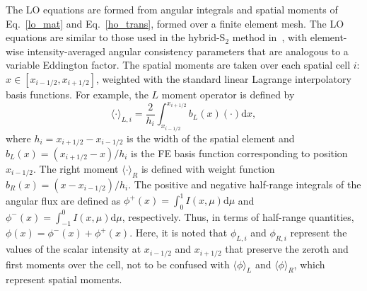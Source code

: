 \documentclass{mc2013}
\renewcommand{\d}{\mathrm{d}}
\newcommand{\mom}[1]{\langle #1 \rangle}
\newcommand{\xr}{{x_{i+1/2}}}
\newcommand{\il}{{i-1/2}}
\newcommand{\ir}{{i+1/2}}
\begin{document}


The LO equations are formed from
angular integrals and spatial moments of
Eq.~\eqref{lo_mat} and Eq.~\eqref{ho_trans}, formed over a finite element mesh. The
LO equations are similar to those used in the
hybrid-S$_2$ method in~\cite{wolters}, with
element-wise intensity-averaged angular consistency parameters that are analogous to a variable
Eddington factor.  The spatial moments are taken over each spatial cell $i$:
$x\in[x_{i-1/2},x_{i+1/2}]$, weighted with the standard linear Lagrange
interpolatory basis functions.  For example, the $L$  moment operator is defined by
\begin{equation}\label{x_mom}
\mom{\cdot}_{L,i} = \frac{2}{h_i} \int_{x_{i-1/2}}^{\xr} b_L(x) (\cdot) \d x,
\end{equation}
where $h_i=x_{i+1/2}-x_{i-1/2}$ is the width of the spatial element and
$b_L(x)=(x_{i+1/2}-x)/h_i$ is the FE basis function corresponding to position
$x_{i-1/2}$.  The right moment $\mom{\cdot}_R$ is defined with weight function $b_R(x)=(x -
x_{i-1/2})/h_i$.  The positive and negative half-range integrals of the angular flux are defined as
$ \phi^+(x) = \int_0^{1} I(x,\mu) \d \mu$ and $ \phi^-(x) = \int_{-1}^{0} I(x,\mu) \d
\mu$, respectively.  Thus, in terms of half-range quantities, $\phi(x) = \phi^-(x) +
\phi ^+(x)$.  Here, it is noted that $\phi_{L,i}$ and $\phi_{R,i}$ represent
the values of the scalar intensity at $x_\il$ and $x_\ir$ that preserve the zeroth
and first moments over the cell, not to be confused with $\mom{\phi}_L$ and
$\mom{\phi}_R$, which
represent spatial moments.
\end{document}

